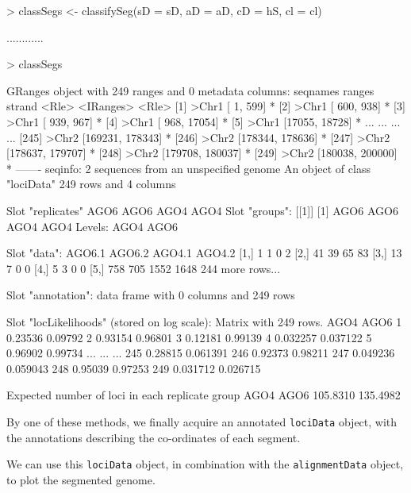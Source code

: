 \documentclass[a4paper]{article}
\begin{document}
\begin{Schunk}
\begin{Sinput}
> classSegs <- classifySeg(sD = sD, aD = aD, cD = hS, cl = cl)      
\end{Sinput}
\begin{Soutput}
............
\end{Soutput}
\begin{Sinput}
> classSegs
\end{Sinput}
\begin{Soutput}
GRanges object with 249 ranges and 0 metadata columns:
        seqnames           ranges strand
           <Rle>        <IRanges>  <Rle>
    [1]    >Chr1   [    1,   599]      *
    [2]    >Chr1   [  600,   938]      *
    [3]    >Chr1   [  939,   967]      *
    [4]    >Chr1   [  968, 17054]      *
    [5]    >Chr1   [17055, 18728]      *
    ...      ...              ...    ...
  [245]    >Chr2 [169231, 178343]      *
  [246]    >Chr2 [178344, 178636]      *
  [247]    >Chr2 [178637, 179707]      *
  [248]    >Chr2 [179708, 180037]      *
  [249]    >Chr2 [180038, 200000]      *
  -------
  seqinfo: 2 sequences from an unspecified genome
An object of class "lociData"
249 rows and 4 columns

Slot "replicates"
AGO6 AGO6 AGO4 AGO4
Slot "groups":
[[1]]
[1] AGO6 AGO6 AGO4 AGO4
Levels: AGO4 AGO6


Slot "data":
     AGO6.1 AGO6.2 AGO4.1 AGO4.2
[1,]      1      1      0      2
[2,]     41     39     65     83
[3,]     13      7      0      0
[4,]      5      3      0      0
[5,]    758    705   1552   1648
244 more rows...

Slot "annotation":
data frame with 0 columns and 249 rows

Slot "locLikelihoods" (stored on log scale):
Matrix with  249  rows.
        AGO4     AGO6
1    0.23536  0.09792
2    0.93154  0.96801
3    0.12181  0.99139
4   0.032257 0.037122
5    0.96902  0.99734
...      ...      ...
245  0.28815 0.061391
246  0.92373  0.98211
247 0.049236 0.059043
248  0.95039  0.97253
249 0.031712 0.026715

Expected number of loci in each replicate group
    AGO4     AGO6 
105.8310 135.4982 
\end{Soutput}
\end{Schunk}

By one of these methods, we finally acquire an annotated \verb'lociData' object, with the annotations describing the co-ordinates of each segment.


We can use this \verb'lociData' object, in combination with the \verb'alignmentData' object, to plot the segmented genome.
\end{document}
